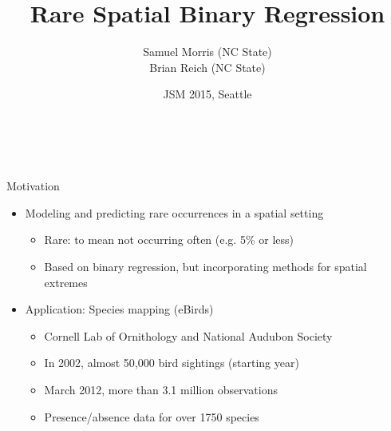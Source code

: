 \documentclass{beamer}
\title[Rare Spatial Binary Regression] %
{
  Rare Spatial Binary Regression
}
\author[S. Morris and B. Reich]{Samuel Morris (NC State)\\
        Brian Reich (NC State)}
\institute[NCSU]{}
\date{JSM 2015, Seattle}
\begin{document}
\begin{frame}\frametitle{\ }
\begin{center}
	\maketitle
\end{center}
\end{frame}

\begin{frame}{Motivation}
\begin{itemize} \setlength{\itemsep}{1em}
  \item Modeling and predicting rare occurrences in a spatial setting
  \begin{itemize} \setlength{\itemsep}{0.5em}
    \item \alert{Rare}: to mean not occurring often (e.g. 5\% or less)
    \item Based on binary regression, but incorporating methods for spatial extremes
  \end{itemize}
  \item Application: Species mapping (eBirds)
  \begin{itemize} \setlength{\itemsep}{0.5em}
    \item Cornell Lab of Ornithology and National Audubon Society
    \item In 2002, almost 50,000 bird sightings (starting year)
    \item March 2012, more than 3.1 million observations
    \item Presence/absence data for over 1750 species
  \end{itemize}
\end{itemize}
\end{frame}
\end{document}
